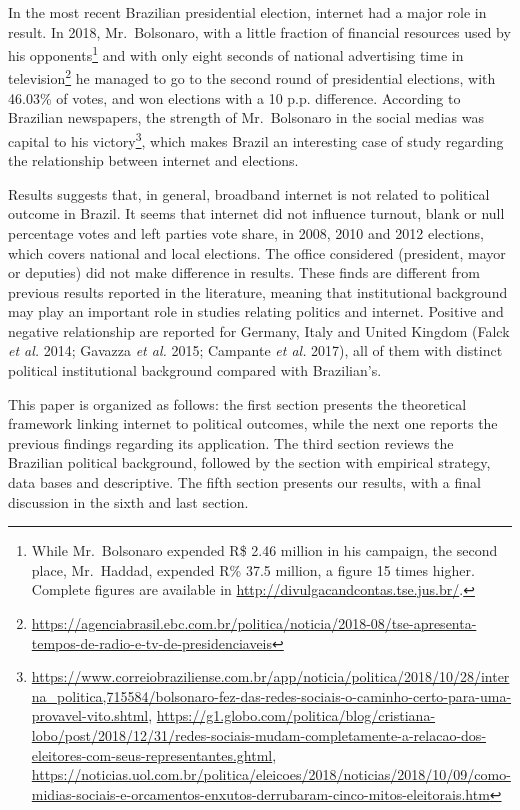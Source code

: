 \documentclass[
  12pt,
]{article}
\begin{document}
In the most recent Brazilian presidential election, internet had a major
role in result. In 2018, Mr.~Bolsonaro, with a little fraction of
financial resources used by his opponents\footnote{While Mr.~Bolsonaro
  expended R\$ 2.46 million in his campaign, the second place,
  Mr.~Haddad, expended R\% 37.5 million, a figure 15 times higher.
  Complete figures are available in
  \url{http://divulgacandcontas.tse.jus.br/}.} and with only eight
seconds of national advertising time in television\footnote{\url{https://agenciabrasil.ebc.com.br/politica/noticia/2018-08/tse-apresenta-tempos-de-radio-e-tv-de-presidenciaveis}}
he managed to go to the second round of presidential elections, with
46.03\% of votes, and won elections with a 10 p.p. difference. According
to Brazilian newspapers, the strength of Mr.~Bolsonaro in the social
medias was capital to his victory\footnote{\url{https://www.correiobraziliense.com.br/app/noticia/politica/2018/10/28/interna_politica,715584/bolsonaro-fez-das-redes-sociais-o-caminho-certo-para-uma-provavel-vito.shtml},
  \url{https://g1.globo.com/politica/blog/cristiana-lobo/post/2018/12/31/redes-sociais-mudam-completamente-a-relacao-dos-eleitores-com-seus-representantes.ghtml},
  \url{https://noticias.uol.com.br/politica/eleicoes/2018/noticias/2018/10/09/como-midias-sociais-e-orcamentos-enxutos-derrubaram-cinco-mitos-eleitorais.htm}},
which makes Brazil an interesting case of study regarding the
relationship between internet and elections.

Results suggests that, in general, broadband internet is not related to
political outcome in Brazil. It seems that internet did not influence
turnout, blank or null percentage votes and left parties vote share, in
2008, 2010 and 2012 elections, which covers national and local
elections. The office considered (president, mayor or deputies) did not
make difference in results. These finds are different from previous
results reported in the literature, meaning that institutional
background may play an important role in studies relating politics and
internet. Positive and negative relationship are reported for Germany,
Italy and United Kingdom (Falck \emph{et al.} 2014; Gavazza \emph{et
al.} 2015; Campante \emph{et al.} 2017), all of them with distinct
political institutional background compared with Brazilian's.

This paper is organized as follows: the first section presents the
theoretical framework linking internet to political outcomes, while the
next one reports the previous findings regarding its application. The
third section reviews the Brazilian political background, followed by
the section with empirical strategy, data bases and descriptive. The
fifth section presents our results, with a final discussion in the sixth
and last section.
\end{document}
